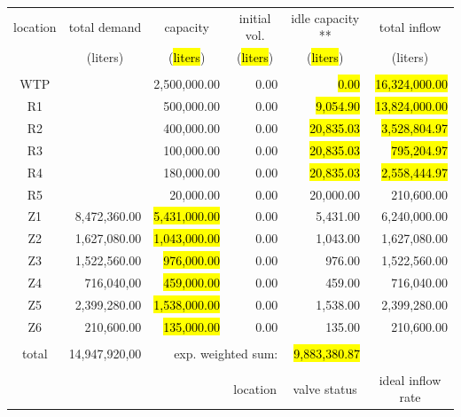\documentclass{singlecol}
\theoremstyle{TH}{
\newtheorem{lemma}{Lemma}
\newtheorem{theorem}[lemma]{Theorem}
\newtheorem{corrolary}[lemma]{Corrolary}
\newtheorem{conjecture}[lemma]{Conjecture}
\newtheorem{proposition}[lemma]{Proposition}
\newtheorem{claim}[lemma]{Claim}
\newtheorem{stheorem}[lemma]{Wrong Theorem}
\newtheorem{algorithm}{Algorithm}
}
\theoremstyle{THrm}{
\newtheorem{definition}{Definition}[section]
\newtheorem{question}{Question}[section]
\newtheorem{remark}{Remark}
\newtheorem{scheme}{Scheme}
}
\theoremstyle{THhit}{
\newtheorem{case}{Case}[section]
}
\begin{document}
\begin{table}[t]
\begin{center}
\begin{small}
	\begin{tabular}{ c r r r r r } 
		location & \multicolumn{1}{c}{total demand}      & \multicolumn{1}{c}{capacity} & \multicolumn{1}{c}{initial vol.} & \multicolumn{1}{c}{idle capacity **} & \multicolumn{1}{c}{total inflow}  \\
		      & \multicolumn{1}{c}{(liters)} & \multicolumn{1}{c}{(\hl{liters})}   & \multicolumn{1}{c}{(\hl{liters})}     &  \multicolumn{1}{c}{(\hl{liters})}   &  \multicolumn{1}{c}{(liters)}               \\
		\\
		WTP   &               & 2,500,000.00 & 0.00 &  \hl{0.00} & \hl{16,324,000.00} \\
		R1    &               &   500,000.00 & 0.00 &    \hl{9,054.90} & \hl{13,824,000.00} \\
		R2    &               &   400,000.00 & 0.00 &    \hl{20,835.03} &  \hl{3,528,804.97} \\
		R3    &               &   100,000.00 & 0.00 &    \hl{20,835.03} &   \hl{795,204.97} \\
	    R4    &               &   180,000.00 & 0.00 &    \hl{20,835.03} &  \hl{2,558,444.97} \\
	    R5    &               &    20,000.00 & 0.00 &     20,000.00 &    210,600.00 \\
	    Z1    &  8,472,360.00 &     \hl{5,431,000.00} & 0.00 &      5,431.00 &  6,240,000.00 \\
	    Z2    &  1,627,080.00 &     \hl{1,043,000.00} & 0.00 &      1,043.00 &  1,627,080.00 \\
	    Z3    &  1,522,560.00 &       \hl{976,000.00} & 0.00 &        976.00 &  1,522,560.00 \\
	    Z4    &    716,040,00 &       \hl{459,000.00} & 0.00 &        459.00 &    716,040.00 \\
	    Z5    &  2,399,280.00 &     \hl{1,538,000.00} & 0.00 &      1,538.00 &  2,399,280.00 \\
	    Z6    &    210,600.00 &       \hl{135,000.00} & 0.00 &        135.00 &    210,600.00 \\
	    \\
	    total & 14,947,920,00 & \multicolumn{2}{r}{exp. weighted sum:} & \hl{9,883,380.87} & \\
		   \\
		&  &      &  \multicolumn{1}{c}{location}    & \multicolumn{1}{c}{valve status}         & \multicolumn{1}{c}{ideal inflow rate}   \\

\end{tabular}
\end{small}
\end{center}
\end{table}
\end{document}
